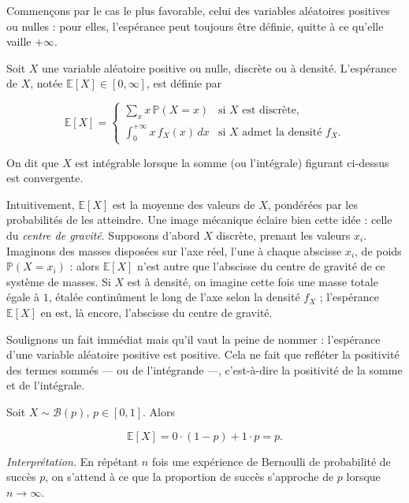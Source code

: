 Commençons par le cas le plus favorable, celui des variables aléatoires positives ou nulles : pour elles, l'espérance peut toujours être définie, quitte à ce qu'elle vaille $+\infty$.

\medskip

\begin{mdframed}
\begin{definition}
Soit $X$ une variable aléatoire positive ou nulle, discrète ou à densité. L'espérance de $X$, notée $\mathbb{E}[X] \in [0, \infty]$, est définie par

$$
\mathbb{E}[X] = \begin{cases} \displaystyle\sum_x x\, \mathbb{P}(X = x) & \text{si } X \text{ est discrète}, \\[8pt] \displaystyle\int_0^{+\infty} x\, f_X(x)\, dx & \text{si } X \text{ admet la densité } f_X. \end{cases}
$$

On dit que $X$ est intégrable lorsque la somme (ou l'intégrale) figurant ci-dessus est convergente.
\end{definition}
\end{mdframed}

Intuitivement, $\mathbb{E}[X]$ est la moyenne des valeurs de $X$, pondérées par les probabilités de les atteindre. Une image mécanique éclaire bien cette idée : celle du \emph{centre de gravité}. Supposons d'abord $X$ discrète, prenant les valeurs $x_i$. Imaginons des masses disposées sur l'axe réel, l'une à chaque abscisse $x_i$, de poids $\mathbb{P}(X = x_i)$ : alors $\mathbb{E}[X]$ n'est autre que l'abscisse du centre de gravité de ce système de masses. Si $X$ est à densité, on imagine cette fois une masse totale égale à $1$, étalée continûment le long de l'axe selon la densité $f_X$ ; l'espérance $\mathbb{E}[X]$ en est, là encore, l'abscisse du centre de gravité.

Soulignons un fait immédiat mais qu'il vaut la peine de nommer : l'espérance d'une variable aléatoire positive est positive. Cela ne fait que refléter la positivité des termes sommés — ou de l'intégrande —, c'est-à-dire la positivité de la somme et de l'intégrale.

\begin{exemple}
Soit $X \sim \mathcal{B}(p)$, $p \in [0, 1]$. Alors

$$
\mathbb{E}[X] = 0 \cdot (1 - p) + 1 \cdot p = p.
$$

\emph{Interprétation.} En répétant $n$ fois une expérience de Bernoulli de probabilité de succès $p$, on s'attend à ce que la proportion de succès s'approche de $p$ lorsque $n \to \infty$.
\end{exemple}


